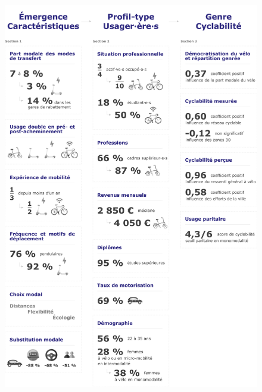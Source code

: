 \begin{refsegment}
\begin{figure}[h!]\vspace*{4pt}
        \caption*{}
        \label{graphical-abstract-chap4}
        \centerline{\includegraphics[width=1\columnwidth]{src/Figures/Graphical-abstract/FR_Graphical_abstract_chap4.pdf}}
        \vspace{5pt}
    \end{figure}


\end{refsegment}
